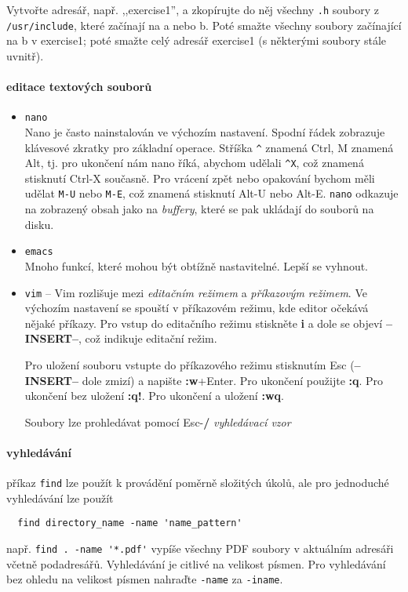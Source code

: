     \begin{exercise}
        Vytvořte adresář, např. ,,exercise1'', a zkopírujte do něj všechny \verb|.h| soubory z \verb|/usr/include|, které začínají na a nebo b. Poté smažte všechny soubory začínající na b v exercise1; poté smažte celý adresář exercise1 (s některými soubory stále uvnitř).
    \end{exercise}

\paragraph{editace textových souborů}
  
\begin{itemize}
  \item
    \verb|nano|~\\
    Nano je často nainstalován ve výchozím nastavení. Spodní řádek zobrazuje klávesové zkratky pro základní operace. Stříška \verb|^| znamená Ctrl, M znamená Alt, tj. pro ukončení nám nano říká, abychom udělali \verb|^X|, což znamená stisknutí Ctrl-X současně. Pro vrácení zpět nebo opakování bychom měli udělat \verb|M-U| nebo \verb|M-E|, což znamená stisknutí Alt-U nebo Alt-E. \verb|nano| odkazuje na zobrazený obsah jako na \emph{buffery}, které se pak ukládají do souborů na disku.
  \item
    \verb|emacs|~\\
    Mnoho funkcí, které mohou být obtížně nastavitelné. Lepší se vyhnout.
  \item
    \verb|vim| -- Vim rozlišuje mezi \emph{editačním režimem} a \emph{příkazovým režimem}. Ve výchozím nastavení se spouští v příkazovém režimu, kde editor očekává nějaké příkazy. Pro vstup do editačního režimu stiskněte \textbf{i} a dole se objeví \textbf{--INSERT--}, což indikuje editační režim.

    Pro uložení souboru vstupte do příkazového režimu stisknutím Esc (\textbf{--INSERT--} dole zmizí) a napište \textbf{:w}+Enter. Pro ukončení použijte \textbf{:q}. Pro ukončení bez uložení \textbf{:q!}. Pro ukončení a uložení \textbf{:wq}.

    Soubory lze prohledávat pomocí Esc-\textbf{/} \emph{vyhledávací vzor}
\end{itemize}

\paragraph{vyhledávání}
 příkaz \verb|find| lze použít k provádění poměrně složitých úkolů, ale pro jednoduché vyhledávání lze použít
\begin{verbatim}
  find directory_name -name 'name_pattern'
\end{verbatim}
např. \verb|find . -name '*.pdf'|
vypíše všechny PDF soubory v aktuálním adresáři včetně podadresářů. Vyhledávání je citlivé na velikost písmen. Pro vyhledávání bez ohledu na velikost písmen nahraďte \verb|-name| za \verb|-iname|.

